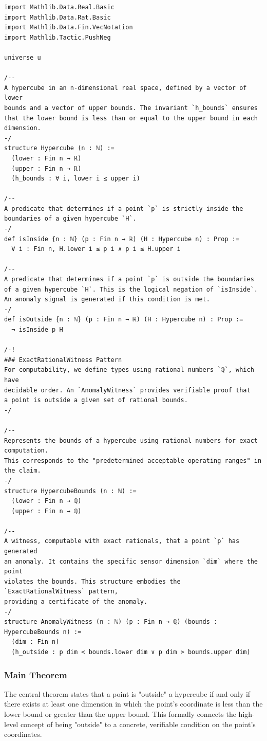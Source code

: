 \documentclass{article}
\begin{document}
\begin{verbatim}
import Mathlib.Data.Real.Basic
import Mathlib.Data.Rat.Basic
import Mathlib.Data.Fin.VecNotation
import Mathlib.Tactic.PushNeg

universe u

/--
A hypercube in an n-dimensional real space, defined by a vector of lower
bounds and a vector of upper bounds. The invariant `h_bounds` ensures
that the lower bound is less than or equal to the upper bound in each dimension.
-/
structure Hypercube (n : ℕ) :=
  (lower : Fin n → ℝ)
  (upper : Fin n → ℝ)
  (h_bounds : ∀ i, lower i ≤ upper i)

/--
A predicate that determines if a point `p` is strictly inside the
boundaries of a given hypercube `H`.
-/
def isInside {n : ℕ} (p : Fin n → ℝ) (H : Hypercube n) : Prop :=
  ∀ i : Fin n, H.lower i ≤ p i ∧ p i ≤ H.upper i

/--
A predicate that determines if a point `p` is outside the boundaries
of a given hypercube `H`. This is the logical negation of `isInside`.
An anomaly signal is generated if this condition is met.
-/
def isOutside {n : ℕ} (p : Fin n → ℝ) (H : Hypercube n) : Prop :=
  ¬ isInside p H

/-!
### ExactRationalWitness Pattern
For computability, we define types using rational numbers `ℚ`, which have
decidable order. An `AnomalyWitness` provides verifiable proof that
a point is outside a given set of rational bounds.
-/

/--
Represents the bounds of a hypercube using rational numbers for exact computation.
This corresponds to the "predetermined acceptable operating ranges" in the claim.
-/
structure HypercubeBounds (n : ℕ) :=
  (lower : Fin n → ℚ)
  (upper : Fin n → ℚ)

/--
A witness, computable with exact rationals, that a point `p` has generated
an anomaly. It contains the specific sensor dimension `dim` where the point
violates the bounds. This structure embodies the `ExactRationalWitness` pattern,
providing a certificate of the anomaly.
-/
structure AnomalyWitness (n : ℕ) (p : Fin n → ℚ) (bounds : HypercubeBounds n) :=
  (dim : Fin n)
  (h_outside : p dim < bounds.lower dim ∨ p dim > bounds.upper dim)

\end{verbatim}

\subsubsection{Main Theorem}
The central theorem states that a point is "outside" a hypercube if and only if there exists at least one dimension in which the point's coordinate is less than the lower bound or greater than the upper bound. This formally connects the high-level concept of being "outside" to a concrete, verifiable condition on the point's coordinates.
\end{document}
